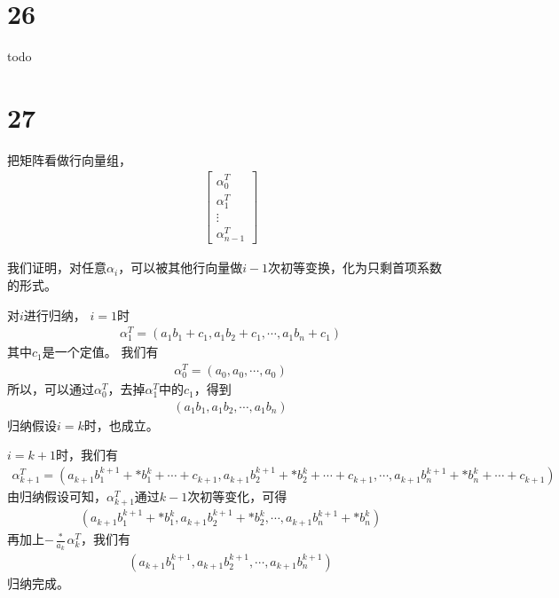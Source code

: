 \documentclass{article}
\begin{document}
\section*{26}

todo

\section*{27}

把矩阵看做行向量组，
\begin{align*}
  \begin{bmatrix}
    \alpha_0^T \\
    \alpha_1^T \\
    \vdots     \\
    \alpha_{n - 1}^T
  \end{bmatrix}
\end{align*}

我们证明，对任意$\alpha_i$，可以被其他行向量做$i - 1$次初等变换，化为只剩首项系数的形式。

对$i$进行归纳，
$i = 1$时
\begin{align*}
  \alpha_1^T = (a_1 b_1 + c_1 , a_1 b_2 + c_1 , \cdots , a_1 b_n + c_1)
\end{align*}
其中$c_1$是一个定值。
我们有
\begin{align*}
  \alpha_0^T = (a_0, a_0, \cdots, a_0)
\end{align*}
所以，可以通过$\alpha_0^T$，去掉$\alpha_1^T$中的$c_1$，得到
\begin{align*}
  (a_1 b_1 , a_1 b_2 , \cdots , a_1 b_n)
\end{align*}
归纳假设$i = k$时，也成立。

$i = k + 1$时，我们有
\begin{align*}
  \alpha_{k+1}^T = (a_{k+1} b_1^{k + 1} + * b_1^{k} + \cdots + c_{k+1}, a_{k+1} b_2^{k + 1} + * b_2^{k} + \cdots + c_{k+1}, \cdots, a_{k+1} b_n^{k + 1} + * b_n^{k} + \cdots + c_{k+1})
\end{align*}
由归纳假设可知，$\alpha_{k+1}^T$通过$k - 1$次初等变化，可得
\begin{align*}
  (a_{k+1} b_1^{k + 1} + * b_1^{k}, a_{k+1} b_2^{k + 1} + * b_2^{k}, \cdots, a_{k+1} b_n^{k + 1} + * b_n^{k})
\end{align*}
再加上$- \frac{*}{a_k} \alpha_{k}^T$，我们有
\begin{align*}
  (a_{k+1} b_1^{k + 1}, a_{k+1} b_2^{k + 1}, \cdots, a_{k+1} b_n^{k + 1})
\end{align*}
归纳完成。
\end{document}
